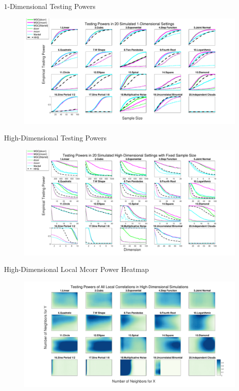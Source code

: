 \documentclass{beamer}
\begin{document}
\begin{frame}{$1$-Dimensional Testing Powers}
\begin{figure}[htbp]
  \centering
\includegraphics[width=1.08\textwidth]{Figures/Fig1}
\end{figure}
\end{frame}

\begin{frame}{High-Dimensional Testing Powers}
\begin{figure}[htbp]
  \centering
\includegraphics[width=1.08\textwidth]{Figures/Fig5}
\end{figure}
\end{frame}

\begin{frame}{High-Dimensional Local Mcorr Power Heatmap}
\begin{figure}[ht]
  \centering
  \includegraphics[width=1.08\textwidth]{Figures/Fig6}
\end{figure} 
\end{frame}
\end{document}
